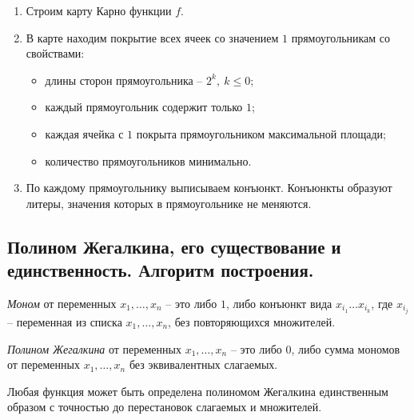 \begin{note}\leavevmode
    \begin{enumerate}
        \item Строим карту Карно функции $f$.
        \item В карте находим покрытие всех ячеек со значением $1$ прямоугольникам со свойствами:
              \begin{itemize}
                  \item длины сторон прямоугольника -- $2^k, \ k \leqslant 0$;
                  \item каждый прямоугольник содержит только $1$;
                  \item каждая ячейка с $1$ покрыта прямоугольником максимальной площади;
                  \item количество прямоугольников минимально.
              \end{itemize}
        \item По каждому прямоугольнику выписываем конъюнкт. Конъюнкты образуют литеры, значения которых в прямоугольнике не меняются.
    \end{enumerate}
\end{note}

\subsection{Полином Жегалкина, его существование и единственность. Алгоритм построения.}

\begin{definition}[Моном]
    \emph{Моном} от переменных $x_1,\ldots,x_n$ -- это либо $1$, либо конъюнкт вида $x_{i_1}\ldots x_{i_k}$, где $x_{i_j}$ -- переменная из списка $x_1,\ldots,x_n$, без повторяющихся множителей.
\end{definition}

\begin{definition}
    \emph{Полином Жегалкина} от переменных $x_1,\ldots,x_n$ -- это либо $0$, либо сумма мономов от переменных $x_1,\ldots,x_n$ без эквивалентных слагаемых.
\end{definition}

\begin{theorem}
    Любая функция может быть определена полиномом Жегалкина единственным образом с точностью до перестановок слагаемых и множителей.
\end{theorem}

